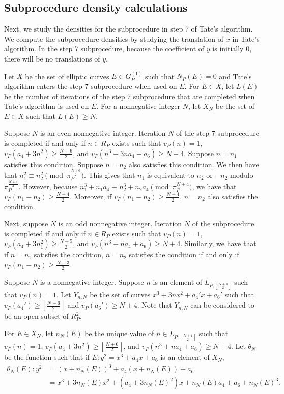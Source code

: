\documentclass[12pt,letterpaper]{amsart}
\theoremstyle{definition}
\begin{document}
\subsection{Subprocedure density calculations}
\label{subsec:subden1}

Next, we study the densities for the subprocedure in step 7 of Tate's algorithm. We compute the subprocedure densities by studying the translation of $x$ in Tate's algorithm. In the step 7 subprocedure, because the coefficient of $y$ is initially $0$, there will be no translations of $y$.

Let $X$ be the set of elliptic curves $E\in G_P^{(1)}$ such that $N_P(E)=0$ and Tate's algorithm enters the step 7 subprocedure when used on $E$. For $E\in X$, let $L(E)$ be the number of iterations of the step 7 subprocedure that are completed when Tate's algorithm is used on $E$. For a nonnegative integer $N$, let $X_N$ be the set of $E\in X$ such that $L(E)\geq N$.

Suppose $N$ is an even nonnegative integer. Iteration $N$ of the step 7 subprocedure is completed if and only if $n\in R_P$ exists such that $v_P(n)=1$, $v_P(a_4+3n^2)\geq\frac{N+6}{2}$, and $v_P(n^3+3na_4+a_6)\geq N+4$. Suppose $n=n_1$ satisfies this condition. Suppose $n=n_2$ also satisfies this condition. We then have that $n_1^2\equiv n_2^2\pmod{\pi_P^{\frac{N+6}{2}}}$. This gives that $n_1$ is equivalent to $n_2$ or $-n_2$ modulo $\pi_P^{\frac{N+4}{2}}$. However, because $n_1^3+n_1a_4\equiv n_2^3+n_2a_4\pmod{\pi_P^{N+4}}$, we have that $v_P(n_1-n_2)\geq\frac{N+4}{2}$. Moreover, if $v_P(n_1-n_2)\geq\frac{N+4}{2}$, $n=n_2$ also satisfies the condition.

Next, suppose $N$ is an odd nonnegative integer. Iteration $N$ of the subprocedure is completed if and only if $n\in R_P$ exists such that $v_P(n)=1$, $v_P(a_4+3n_1^2)\geq\frac{N+5}{2}$, and $v_P(n^3+na_4+a_6)\geq N+4$. Similarly, we have that if $n=n_1$ satisfies the condition, $n=n_2$ satisfies the condition if and only if $v_P(n_1-n_2)\geq \frac{N+3}{2}$.

Suppose $N$ is a nonnegative integer. Suppose $n$ is an element of $L_{P,\left\lfloor\frac{N+4}{2}\right\rfloor}$ such that $v_P(n)=1$. Let $Y_{n,N}$ be the set of curves $x^3+3nx^2+a_4'x+a_6'$ such that $v_P(a_4')\geq\left\lfloor\frac{N+6}{2}\right\rfloor$ and $v_P(a_6')\geq N+4$. Note that $Y_{n,N}$ can be considered to be an open subset of $R_P^2$.

For $E\in X_N$, let $n_N(E)$ be the unique value of $n\in L_{P, \left\lfloor\frac{N+4}{2}\right\rfloor}$ such that $v_P(n)=1$, $v_P(a_4+3n^2)\geq\left\lfloor\frac{N+6}{2}\right\rfloor$, and $v_P(n^3+na_4+a_6)\geq N+4$. Let $\theta_N$ be the function such that if $E: y^2=x^3+a_4x+a_6$ is an element of $X_N$, 
\begin{align*}
\theta_N(E): y^2 & =(x+n_N(E))^3+a_4(x+n_N(E))+a_6 \\
& =x^3+3n_N(E)x^2+(a_4+3n_N(E)^2)x+n_N(E)a_4+a_6+n_N(E)^3.
\end{align*}
\end{document}
